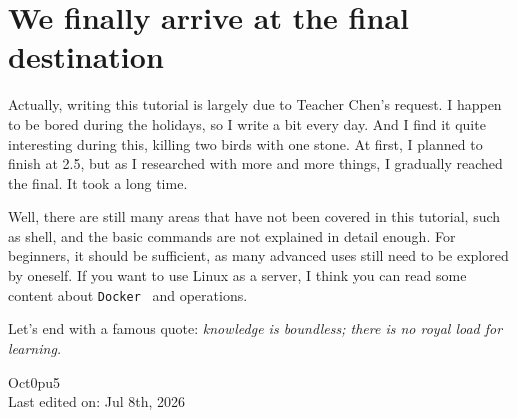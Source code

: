 \documentclass[lang=en,color=blue,12pt]{elegantbook}
\let\oldtexttt\texttt
\renewcommand{\texttt}[1]{%
  \begingroup
  \setlength{\fboxsep}{1pt}%
  \colorbox{gray!10}{\oldtexttt{#1}}%
  \endgroup
}
\begin{document}
\section*{We finally arrive at the final destination}

Actually, writing this tutorial is largely due to Teacher
Chen's request. I happen to be bored during the holidays, so I write a bit
every day. And I find it quite interesting during this, killing two birds
with one stone. At first, I planned to finish at 2.5, but as I researched
with more and more things, I gradually reached the final. It took a long time.

Well, there are still many areas that have not been covered in this
tutorial, such as shell, and the basic commands are not explained in
detail enough. For beginners, it should be sufficient, as many advanced
uses still need to be explored by oneself. If you want to use Linux as a
server, I think you can read some content about \texttt{Docker}\ and operations.

Let's end with a famous quote: \emph{knowledge is boundless; there is no royal
load for learning.}

\begin{flushright}
Oct0pu5\\
Last edited on: Jul 8th, 2026
\end{flushright}
\end{document}
